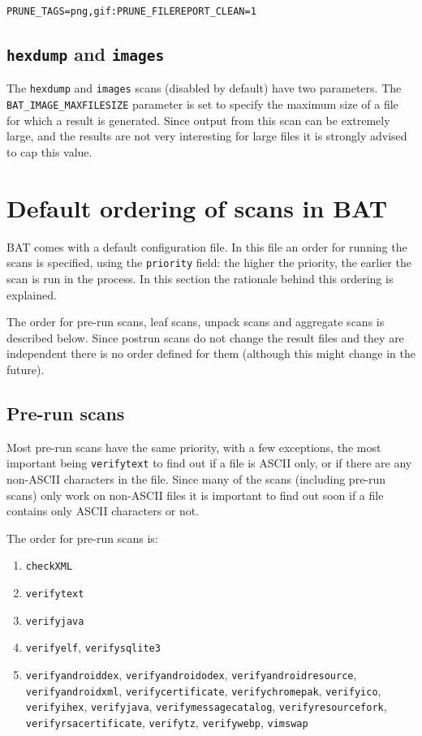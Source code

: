 \documentclass[10pt,a4paper]{article}
\begin{document}
\begin{verbatim}
PRUNE_TAGS=png,gif:PRUNE_FILEREPORT_CLEAN=1
\end{verbatim}

\subsection{\texttt{hexdump} and \texttt{images}}

The \texttt{hexdump} and \texttt{images} scans (disabled by default) have two
parameters. The \texttt{BAT\_IMAGE\_MAXFILESIZE} parameter is set to specify
the maximum size of a file for which a result is generated. Since output from
this scan can be extremely large, and the results are not very interesting for
large files it is strongly advised to cap this value.

\section{Default ordering of scans in BAT}

BAT comes with a default configuration file. In this file an order for running
the scans is specified, using the \texttt{priority} field: the higher the
priority, the earlier the scan is run in the process. In this section the
rationale behind this ordering is explained.

The order for pre-run scans, leaf scans, unpack scans and aggregate scans is
described below. Since postrun scans do not change the result files and they are
independent there is no order defined for them (although this might change in
the future).

\subsection{Pre-run scans}

Most pre-run scans have the same priority, with a few exceptions, the most
important being \texttt{verifytext} to find out if a file is ASCII only, or if
there are any non-ASCII characters in the file. Since many of the scans
(including pre-run scans) only work on non-ASCII files it is important to find
out soon if a file contains only ASCII characters or not.

The order for pre-run scans is:

\begin{enumerate}
\item \texttt{checkXML}
\item \texttt{verifytext}
\item \texttt{verifyjava}
\item \texttt{verifyelf}, \texttt{verifysqlite3}
\item \texttt{verifyandroiddex}, \texttt{verifyandroidodex},
\texttt{verifyandroidresource}, \texttt{verifyandroidxml},
\texttt{verifycertificate}, \texttt{verifychromepak}, \texttt{verifyico},
\texttt{verifyihex}, \texttt{verifyjava}, \texttt{verifymessagecatalog},
\texttt{verifyresourcefork}, \texttt{verifyrsacertificate}, \texttt{verifytz},
\texttt{verifywebp}, \texttt{vimswap}
\end{enumerate}
\end{document}
